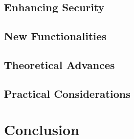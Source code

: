 \documentclass{iacrtrans}
\begin{document}
\subsection{Enhancing Security}
\subsection{New Functionalities}
\subsection{Theoretical Advances}
\subsection{Practical Considerations}

\section{Conclusion}

\pagebreak


\end{document}
